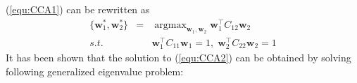 \documentclass[a4paper]{article}
\newcommand{\argmax}{\mathop\mathrm{argmax}}
\begin{document}
(\ref{equ:CCA1}) can be rewritten as   
\begin{eqnarray}
        \{\mathbf{w}_1^*,\mathbf{w}_2^*\} &=& \argmax_{\mathbf{w}_1,\mathbf{w}_2}\mathbf{w}_1^\top C_{12} \mathbf{w}_2     \label{equ:CCA2}\\
                     s.t.    & &  \mathbf{w}_1^\top C_{11} \mathbf{w}_1=1,\; \mathbf{w}_2^\top C_{22} \mathbf{w}_2=1 \nonumber
\end{eqnarray}
It has been shown \cite{Bie_05,HardoonSS04} that the solution to (\ref{equ:CCA2}) can be obtained by solving following generalized eigenvalue problem:   
\end{document}
